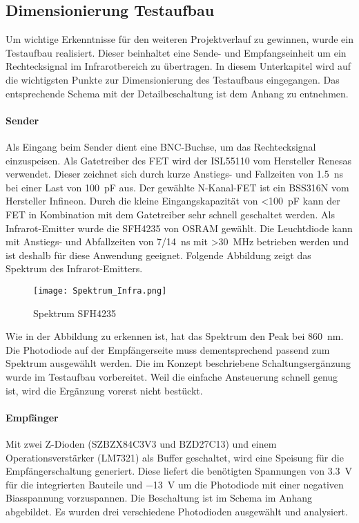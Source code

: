 \subsection{Dimensionierung Testaufbau}
Um wichtige Erkenntnisse für den weiteren Projektverlauf zu gewinnen, wurde ein Testaufbau realisiert. Dieser beinhaltet eine Sende- und Empfangseinheit um ein Rechtecksignal im Infrarotbereich zu übertragen. 
In diesem Unterkapitel wird auf die wichtigsten Punkte zur Dimensionierung des Testaufbaus eingegangen. Das entsprechende Schema mit der Detailbeschaltung ist dem Anhang zu entnehmen.
\paragraph{Sender} 
Als Eingang beim Sender dient eine BNC-Buchse, um das Rechtecksignal einzuspeisen. Als Gatetreiber des FET wird der ISL55110 vom Hersteller Renesas verwendet. Dieser zeichnet sich durch kurze Anstiegs- und Fallzeiten von \SI{1.5}{ns} bei einer Last von \SI{100}{pF} aus.
Der gewählte N-Kanal-FET ist ein BSS316N vom Hersteller Infineon. Durch die kleine Eingangskapazität von \textless \SI{100}{pF} kann der FET in Kombination mit dem Gatetreiber sehr schnell geschaltet werden.
Als Infrarot-Emitter wurde die SFH4235 von OSRAM gewählt. Die Leuchtdiode kann mit Anstiegs- und Abfallzeiten von 7/\SI{14}{ns} mit \textgreater \SI{30}{MHz} betrieben werden und ist deshalb für diese Anwendung geeignet. Folgende Abbildung zeigt das Spektrum des Infrarot-Emitters.

\begin{figure}[h]
	\centering
	\texttt{[image: Spektrum\_Infra.png]}
	\caption{Spektrum SFH4235}\label{fig:Spektrum_Infra}
\end{figure}

Wie in der Abbildung zu erkennen ist, hat das Spektrum den Peak bei \SI{860}{nm}. Die Photodiode auf der Empfängerseite muss dementsprechend passend zum Spektrum ausgewählt werden. Die im Konzept beschriebene Schaltungsergänzung wurde im Testaufbau vorbereitet. Weil die einfache Ansteuerung schnell genug ist, wird die Ergänzung vorerst nicht bestückt.

\paragraph{Empfänger}
Mit zwei Z-Dioden (SZBZX84C3V3 und BZD27C13) und einem Operationsverstärker (LM7321) als Buffer geschaltet, wird eine Speisung für die Empfängerschaltung generiert. Diese liefert die benötigten Spannungen von \SI{3.3}{V} für die integrierten Bauteile und \SI{-13}{V} um die Photodiode mit einer negativen Biasspannung vorzuspannen. Die Beschaltung ist im Schema im Anhang abgebildet.
\newline
Es wurden drei verschiedene Photodioden ausgewählt und analysiert.

